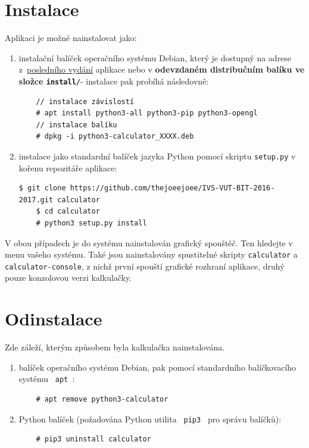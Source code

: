 \documentclass[a4paper, 11pt]{article}
\begin{document}
\section{Instalace}
Aplikaci je možné nainstalovat jako: \\
\begin{enumerate}
    \item instalační balíček operačního systému Debian, který je dostupný na adrese z~\href{https://github.com/thejoeejoee/IVS-VUT-BIT-2016-2017/releases/latest}{posledního vydání} aplikace nebo v \textbf{odevzdaném distribučním balíku ve složce \texttt{install/}}- instalace pak probíhá následovně: \\
    \begin{lstlisting}
    // instalace závislostí
    # apt install python3-all python3-pip python3-opengl
    // instalace balíku
    # dpkg -i python3-calculator_XXXX.deb
    \end{lstlisting}
    \item instalace jako standardní balíček jazyka Python pomocí skriptu \texttt{setup.py} v kořenu repozitáře aplikace:
    \begin{lstlisting}[breaklines]
    $ git clone https://github.com/thejoeejoee/IVS-VUT-BIT-2016-2017.git calculator
    $ cd calculator
    # python3 setup.py install
    \end{lstlisting}
\end{enumerate}

V obou případech je do systému nainstalován grafický spouštěč. Ten hledejte
v menu vašeho systému. Také jsou nainstalovány spustitelné skripty
\texttt{calculator}     a \texttt{calculator-console}, z nichž první spouští
grafické rozhraní aplikace, druhý pouze konzolovou verzi kalkulačky.

\section{Odinstalace}

Zde záleží, kterým způsobem byla kalkulačka nainstalována.
\begin{enumerate}
    \item balíček operačního systému Debian, pak pomocí standardního balíčkovacího systému \texttt{ apt }:
    \begin{lstlisting}
    # apt remove python3-calculator
    \end{lstlisting}
    \item Python balíček (požadována Python utilita \texttt{ pip3 } pro správu balíčků):
    \begin{lstlisting}
    # pip3 uninstall calculator
    \end{lstlisting}
\end{enumerate}
\end{document}
